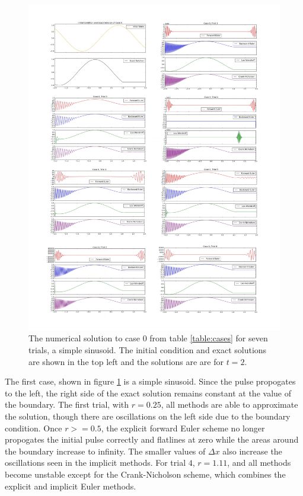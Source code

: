 \documentclass[twocolumn]{article}
\begin{document}
\begin{figure}[ph]
	\centering
	\includegraphics[width=\textwidth, trim=0 0 0 4.5cm]{case0}
	\caption{
		The numerical solution to case $0$ from table \ref{table:cases}
		for seven trials, a simple sinusoid. The initial condition and
		exact solutions are shown in the top left and the solutions are
		are for $t=2$.
	}
	\label{fig:case0}
\end{figure}

The first case, shown in figure \ref{fig:case0} is a simple
sinusoid. Since the pulse propogates to the left, the right side of
the exact solution remains constant at the value of the boundary. The
first trial, with $r = 0.25$, all methods are able to approximate the
solution, though there are oscillations on the left side due to the
boundary condition. Once $r >= 0.5$, the explicit forward Euler scheme
no longer propogates the initial pulse correctly and flatlines at zero
while the areas around the boundary increase to infinity. The smaller
values of $\Delta x$ also increase the oscillations seen in the
implicit methods. For trial $4$, $r = 1.11$, and all methods become
unstable except for the Crank-Nicholson scheme, which combines the
explicit and implicit Euler methods.
\end{document}
